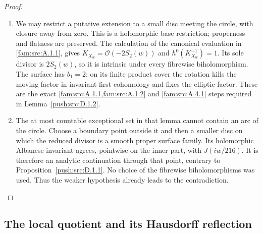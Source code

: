 \begin{proof}
\begin{enumerate}[label=\arabic*.,leftmargin=*]
\item We may restrict a putative extension to a small disc meeting the
circle, with closure away from zero. This is a holomorphic base
restriction; properness and flatness are preserved. The calculation
of the canonical evaluation in \cref{fam:src:A.1.1}, gives
\(K_{X_w}=\mathcal O(-2S_2(w))\) and
\(h^0(K_{X_w}^{-1})=1\). Its sole divisor is \(2S_2(w)\), so it is
intrinsic under every fibrewise biholomorphism. The surface has
\(b_1=2\): on its finite product cover the rotation kills the moving
factor in invariant first cohomology and fixes the elliptic factor.
These are the exact \cref{fam:src:A.1.1,fam:src:A.1.2} and \cref{fam:src:A.4.1} steps required in Lemma~\ref{push:src:D.1.2}.

\item The at most countable exceptional set in that lemma cannot contain
an arc of the circle. Choose a boundary point outside it and then a smaller disc
on which the reduced divisor is a smooth proper surface family. Its
holomorphic Albanese invariant agrees, pointwise on the inner part,
with \(J(iw/216)\). It is therefore an analytic continuation through
that point, contrary to Proposition~\ref{push:src:D.1.1}. No choice of the
fibrewise biholomorphisms was used. Thus the weaker hypothesis already
leads to the contradiction.
\end{enumerate}
\end{proof}

\subsection{The local quotient and its Hausdorff reflection}\label{push:section:D.2}

